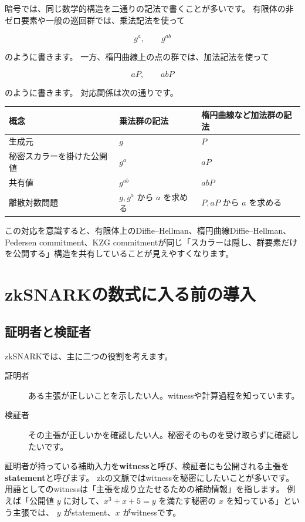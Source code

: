 \documentclass[a4paper,11pt]{ltjsarticle}
\begin{document}
暗号では、同じ数学的構造を二通りの記法で書くことが多いです。
有限体の非ゼロ要素や一般の巡回群では、乗法記法を使って

\[
  g^a,\qquad g^{ab}
\]

のように書きます。
一方、楕円曲線上の点の群では、加法記法を使って

\[
  aP,\qquad abP
\]

のように書きます。
対応関係は次の通りです。

\begin{center}
\begin{tabularx}{\linewidth}{@{}lYY@{}}
\toprule
概念 & 乗法群の記法 & 楕円曲線など加法群の記法 \\
\midrule
生成元 & \(g\) & \(P\) \\
秘密スカラーを掛けた公開値 & \(g^a\) & \(aP\) \\
共有値 & \(g^{ab}\) & \(abP\) \\
離散対数問題 & \(g,g^a\) から \(a\) を求める & \(P,aP\) から \(a\) を求める \\
\bottomrule
\end{tabularx}
\end{center}

この対応を意識すると、有限体上のDiffie--Hellman、楕円曲線Diffie--Hellman、Pedersen commitment、KZG commitmentが同じ「スカラーは隠し、群要素だけを公開する」構造を共有していることが見えやすくなります。

\section{zkSNARKの数式に入る前の導入}

\subsection{証明者と検証者}

zkSNARKでは、主に二つの役割を考えます。

\begin{description}
  \item[証明者] ある主張が正しいことを示したい人。witnessや計算過程を知っています。
  \item[検証者] その主張が正しいかを確認したい人。秘密そのものを受け取らずに確認したいです。
\end{description}

証明者が持っている補助入力を\textbf{witness}と呼び、検証者にも公開される主張を\textbf{statement}と呼びます。
zkの文脈ではwitnessを秘密にしたいことが多いです。用語としてのwitnessは「主張を成り立たせるための補助情報」を指します。
例えば「公開値 \(y\) に対して、\(x^3 + x + 5 = y\) を満たす秘密の \(x\) を知っている」という主張では、
\(y\) がstatement、\(x\) がwitnessです。
\end{document}
